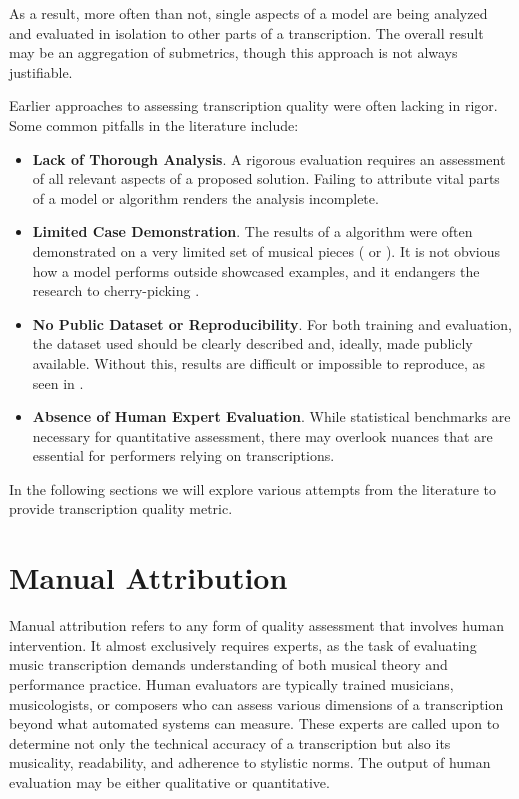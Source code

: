 As a result, more often than not, single aspects of a model are being analyzed and evaluated in isolation to other parts of a transcription. The overall result may be an aggregation of submetrics, though this approach is not always justifiable.

Earlier approaches to assessing transcription quality were often lacking in rigor. Some common pitfalls in the literature include:\begin{itemize}
	\item {\bf Lack of Thorough Analysis}. A rigorous evaluation requires an assessment of all relevant aspects of a proposed solution. Failing to attribute vital parts of a model or algorithm renders the analysis incomplete.
	\item {\bf Limited Case Demonstration}. The results of a algorithm were often demonstrated on a very limited set of musical pieces (\cite{Takeda2002} or \cite{Yang2005}). It is not obvious how a model performs outside showcased examples, and it endangers the research to cherry-picking \missing.
	\item {\bf No Public Dataset or Reproducibility}. For both training and evaluation, the dataset used should be clearly described and, ideally, made publicly available. Without this, results are difficult or impossible to reproduce, as seen in \cite{Takeda2002}.
	\item {\bf Absence of Human Expert Evaluation}. While statistical benchmarks are necessary for quantitative assessment, there may overlook nuances that are essential for performers relying on transcriptions.
\end{itemize} 

In the following sections we will explore various attempts from the literature to provide transcription quality metric.

\section{Manual Attribution}

Manual attribution refers to any form of quality assessment that involves human intervention. It almost exclusively requires experts, as the task of evaluating music transcription demands understanding of both musical theory and performance practice. Human evaluators are typically trained musicians, musicologists, or composers who can assess various dimensions of a transcription beyond what automated systems can measure. These experts are called upon to determine not only the technical accuracy of a transcription but also its musicality, readability, and adherence to stylistic norms. The output of human evaluation may be either qualitative or quantitative. 

